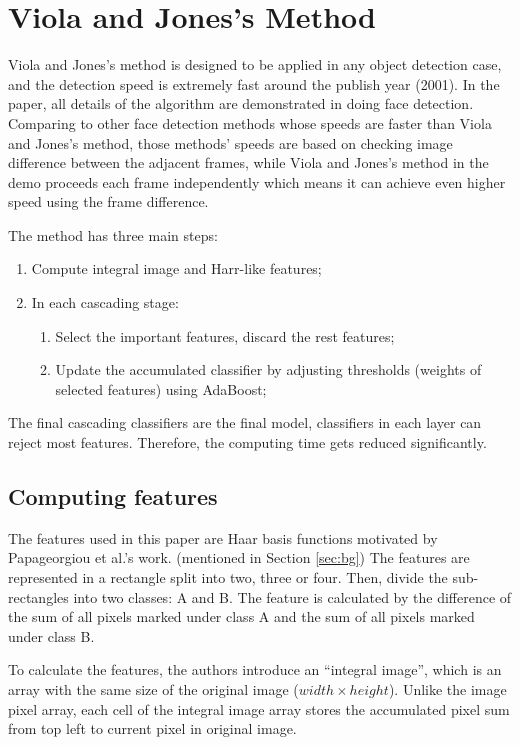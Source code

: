 \documentclass[10pt,twocolumn,letterpaper]{article}
\begin{document}
\section{Viola and Jones's Method}
Viola and Jones's method is designed to be applied in any object detection case, and the detection speed is extremely fast around the publish year (2001).
In the paper, all details of the algorithm are demonstrated in doing face detection.
Comparing to other face detection methods whose speeds are faster than Viola and Jones's method,
those methods' speeds are based on checking image difference between the adjacent frames,
while Viola and Jones's method in the demo proceeds each frame independently which means it can achieve even higher speed using the frame difference.

The method has three main steps:
\begin{enumerate}
    \item Compute integral image and Harr-like features;
    \item In each cascading stage:
          \begin{enumerate}
              \item Select the important features, discard the rest features;
              \item Update the accumulated classifier by adjusting thresholds (weights of selected features) using AdaBoost;
          \end{enumerate}
\end{enumerate}

The final cascading classifiers are the final model, classifiers in each layer can reject most features.
Therefore, the computing time gets reduced significantly.

\subsection{Computing features} \label{sec:cf}
The features used in this paper are Haar basis functions motivated by Papageorgiou et al.'s work. (mentioned in Section \ref{sec:bg})
The features are represented in a rectangle split into two, three or four. Then, divide the sub-rectangles into two classes: A and B.
The feature is calculated by the difference of the sum of all pixels marked under class A and the sum of all pixels marked under class B.

To calculate the features, the authors introduce an ``integral image'', which is an array with the same size of the original image ($width \times height$).
Unlike the image pixel array, each cell of the integral image array stores the accumulated pixel sum from top left to current pixel in original image.
\end{document}
